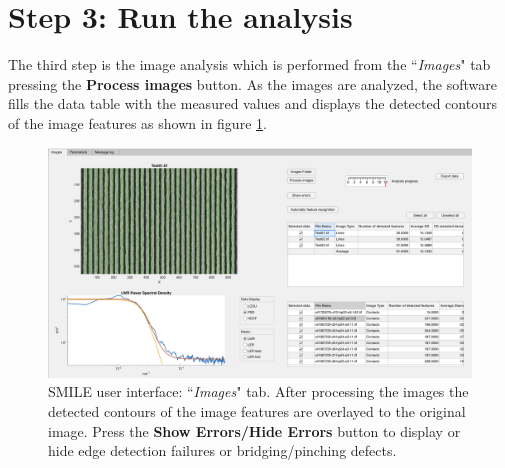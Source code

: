\documentclass[12pt, a4paper, openany]{report}
\begin{document}
\section{Step 3: Run the analysis}
The third step is the image analysis which is performed from the ``\emph{Images}" tab pressing the \textbf{Process images} button. As the images are analyzed, the software fills the data table with the measured values and displays the detected contours of the image features as shown in figure \ref{fig:GUI_01B}.
\begin{figure}[htbp]
	\includegraphics[width=\textwidth]{figures/GUI_01B.png}
	\caption{SMILE user interface: ``\emph{Images}" tab. After processing the images the detected contours of the image features are overlayed to the original image. Press the \textbf{Show Errors/Hide Errors} button to display or hide edge detection failures or bridging/pinching defects.}
	\label{fig:GUI_01B}
\end{figure}
\end{document}
